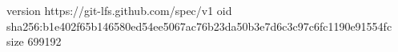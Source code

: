 version https://git-lfs.github.com/spec/v1
oid sha256:b1e402f65b146580ed54ee5067ac76b23da50b3e7d6c3c97c6fc1190e91554fc
size 699192
